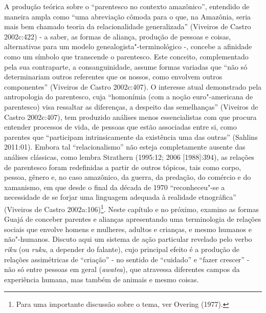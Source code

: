 A produção teórica sobre o ``parentesco no contexto amazônico'', entendido
de maneira ampla como ``uma abreviação cômoda para o que, na Amazônia,
seria mais bem chamado teoria da relacionalidade generalizada'' (Viveiros
de Castro 2002c:422) - a saber, as formas de aliança, produção de
pessoas e coisas, alternativas para um modelo genealogista"-terminológico
-, concebe a afinidade como um símbolo que transcende o parentesco. Este
conceito, complementado pela sua contraparte, a consanguinidade, assume
formas variadas que ``não só determinariam outros referentes que os
nossos, como envolvem outros componentes'' (Viveiros de Castro
2002c:407). O interesse atual demonstrado pela antropologia do
parentesco, cuja ``homonímia (com a noção euro"-americana de parentesco)
visa ressaltar as diferenças, a despeito das semelhanças'' (Viveiros de
Castro 2002c:407), tem produzido análises menos essencialistas com que
procura entender processos de vida, de pessoas que estão associadas
entre si, como parentes que ``participam intrinsicamente da existência
uma das outras'' (Sahlins 2011:01). Embora tal ``relacionalismo'' não
esteja completamente ausente das análises clássicas, como lembra
Strathern (1995:12; 2006 {[}1988{]}:394), as relações de parentesco
foram redefinidas a partir de outros tópicos, tais como corpo, pessoa,
gênero e, no caso amazônico, da guerra, da predação, do comércio e do
xamanismo, em que desde o final da década de 1970 ``reconheceu"-se a
necessidade de se forjar uma linguagem adequada à realidade etnográfica''
(Viveiros de Castro 2002a:106)\footnote{Para uma importante discussão
  sobre o tema, ver Overing (1977).}. Neste capítulo e no próximo,
examino as formas Guajá de conceber parentes e alianças apresentando uma
terminologia de relações sociais que envolve homens e mulheres, adultos
e crianças, e mesmo humanos e não"-humanos. Discuto aqui um sistema de
ação particular revelado pelo verbo \emph{riku} (ou \emph{ruku}, a
depender do falante), cujo principal efeito é a produção de relações
assimétricas de ``criação'' - no sentido de ``cuidado'' e ``fazer crescer'' -
não só entre pessoas em geral (\emph{awatea}), que atravessa diferentes
campos da experiência humana, mas também de animais e mesmo coisas.

